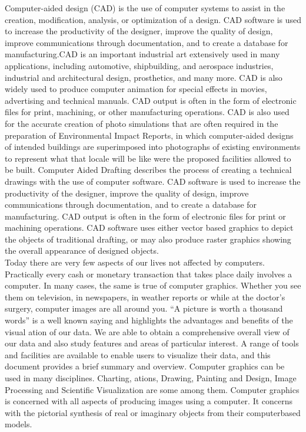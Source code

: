 Computer-aided design (CAD) is the use of computer systems to assist in the creation, modification, analysis, or optimization of a design. CAD software is used to increase the productivity of the designer, improve the quality of design, improve communications through documentation, and to create a database for manufacturing.CAD is an important industrial art extensively used in many applications, including automotive, shipbuilding, and aerospace industries, industrial and architectural design, prosthetics, and many more. CAD is also widely used to produce computer animation for special effects in movies, advertising and technical manuals. CAD output is often in the form of electronic files for print, machining, or other manufacturing operations. CAD is also used for the accurate creation of photo simulations that are often required in the preparation of Environmental Impact Reports, in which computer-aided designs of intended buildings are superimposed into photographs of existing environments to represent what that locale will be like were the proposed facilities allowed to be built.  Computer­ Aided  Drafting  describes  the  process  of  creating  a
technical  drawings with the use of computer software. CAD software is used to increase the productivity
of  the  designer,  improve  the  quality  of  design,  improve  communications  through  documentation,  and  to
create  a  database  for  manufacturing.  CAD  output  is  often  in  the  form  of  electronic  files  for  print  or
machining  operations.  CAD  software  uses  either  vector  based  graphics  to  depict  the  objects  of
traditional  drafting,  or  may  also  produce  raster  graphics  showing  the  overall   appearance  of  designed
objects.\\

  Today  there  are  very  few  aspects  of  our  lives  not  affected  by  computers.  Practically  every  cash or
monetary  transaction  that  takes  place  daily  involves  a  computer.  In  many  cases,  the  same  is  true  of
computer  graphics.  Whether  you  see  them  on  television,  in  newspapers,  in  weather   reports  or  while  at
the  doctor’s  surgery,  computer  images  are  all  around  you.  “A  picture  is  worth  a  thousand  words”  is  a
well ­known  saying  and  highlights  the  advantages  and  benefits  of  the  visual ation of our data. We
are  able  to  obtain  a  comprehensive  overall  view  of  our  data  and   also  study  features  and  areas  of
particular  interest. A  range  of  tools
and  facilities  are  available  to  enable  users  to  visualize  their  data,  and  this  document  provides  a  brief
summary  and  overview.  Computer  graphics  can  be  used  in  many  disciplines.  Charting,  ations,
Drawing,  Painting  and  Design,  Image  Processing  and  Scientific  Visualization  are  some  among  them.
Computer  graphics  is concerned with all aspects of producing images using a computer. It concerns with
the pictorial synthesis of real or imaginary objects from their computer­based models.\\

